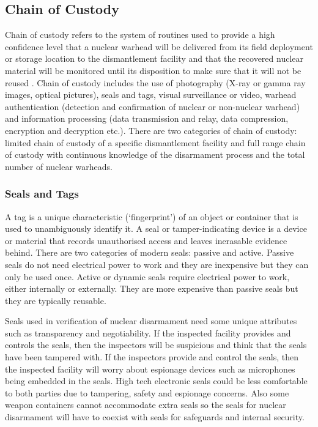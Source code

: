 \documentclass[twocolumn,a4paper]{article}
\begin{document}
\subsection{Chain of Custody}
Chain of custody refers to the system of routines used to provide a
high confidence level that a nuclear warhead will be delivered from
its field deployment or storage location to the dismantlement facility
and that the recovered nuclear material will be monitored until its
disposition to make sure that it will not be reused
\citep{zarimpas2003}. Chain of custody includes the use of photography
(X-ray or gamma ray images, optical pictures), seals and tags, visual
surveillance or video, warhead authentication (detection and
confirmation of nuclear or non-nuclear warhead) and information
processing (data transmission and relay, data compression, encryption
and decryption etc.). There are two categories of chain of custody:
limited chain of custody of a specific dismantlement facility and full
range chain of custody with continuous knowledge of the disarmament
process and the total number of nuclear warheads. \citep{wuwen2004}

\subsubsection{Seals and Tags}
A tag is a unique characteristic (`fingerprint') of an object or
container that is used to unambiguously identify it. A seal or
tamper-indicating device is a device or material that records
unauthorised access and leaves inerasable evidence behind. There are
two categories of modern seals: passive and active. Passive seals do
not need electrical power to work and they are inexpensive but they
can only be used once. Active or dynamic seals require electrical
power to work, either internally or externally. They are more
expensive than passive seals but they are typically reusable. 
\citep{nuclearTamperSeals2001}

Seals used in verification of nuclear disarmament need some unique
attributes such as transparency and negotiability. If the inspected
facility provides and controls the seals, then the inspectors will be
suspicious and think that the seals have been tampered with. If the
inspectors provide and control the seals, then the inspected facility
will worry about espionage devices such as microphones being embedded
in the seals. High tech electronic seals could be less comfortable to
both parties due to tampering, safety and espionage concerns. Also
some weapon containers cannot accommodate extra seals so the seals for
nuclear disarmament will have to coexist with seals for safeguards and
internal security. \citep{nuclearTamperSeals2001}
\end{document}
